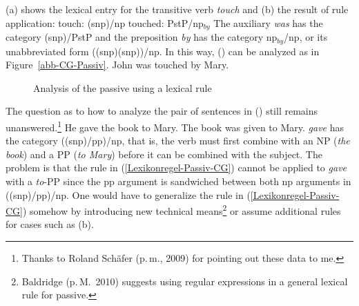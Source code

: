 (a) shows the lexical entry for the transitive verb \emph{touch} and (b) the result of rule application:
\eal
\ex touch:   (s\bs np)/np
\ex touched: PstP/np$_{by}$ 
\zl
\addlines
The auxiliary \emph{was} has the category (s\bs np)/PstP and the preposition \emph{by} has the category  np$_{by}$/np, or its unabbreviated form ((s\bs np)\bs (s\bs np))/np.
In this way, () can be analyzed as in Figure~\vref{abb-CG-Passiv}.
\ea
John was touched by Mary.
\z
\begin{figure}
\centerline{%
}
\caption{\label{abb-CG-Passiv}Analysis of the passive using a lexical rule}
\end{figure}%

\noindent
\addlines
The question as to how to analyze the pair of sentences in () still remains unanswered.\footnote{%
	Thanks to Roland Sch\"{a}fer (p.\,m., 2009) for pointing out these data to me.
}
\eal
\ex He gave the book to Mary.
\ex The book was given to Mary.
\zl
\emph{gave} has the category ((s\bs np)/pp)/np, that is, the verb must first combine with an NP (\emph{the
  book}) and a PP (\emph{to Mary}) before it can be combined with the subject. The problem is that the rule in (\ref{Lexikonregel-Passiv-CG}) cannot be applied to \emph{gave}
  with a \emph{to}-PP since the pp argument is sandwiched between both np arguments in ((s\bs np)/pp)/np. One would have to generalize the rule in (\ref{Lexikonregel-Passiv-CG}) somehow
  by introducing new technical means\footnote{%
  Baldridge (p.\,M.\ 2010) suggests using regular expressions in a general lexical rule for passive.%
 }
  or assume additional rules for cases such as (b).

